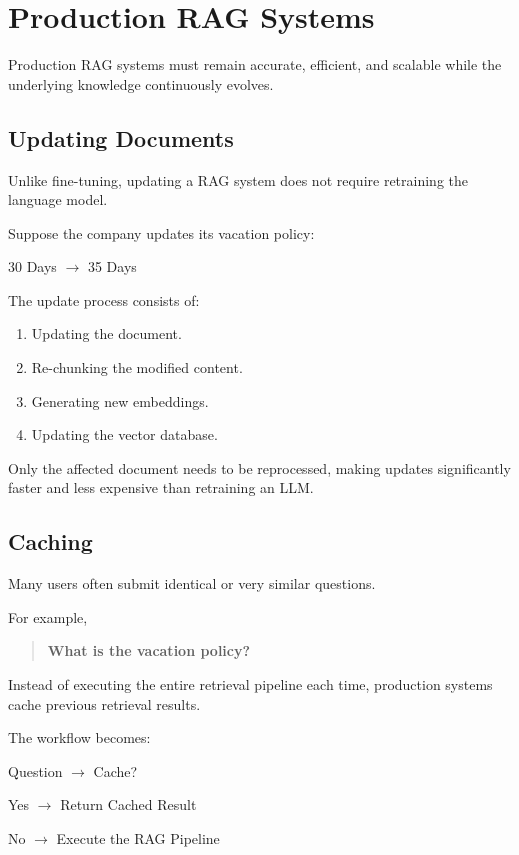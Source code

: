 \section{Production RAG Systems}

Production RAG systems must remain accurate, efficient, and scalable while the underlying knowledge continuously evolves.

\subsection*{Updating Documents}

Unlike fine-tuning, updating a RAG system does not require retraining the language model.

Suppose the company updates its vacation policy:

\begin{center}
30 Days $\rightarrow$ 35 Days
\end{center}

The update process consists of:

\begin{enumerate}
    \item Updating the document.
    \item Re-chunking the modified content.
    \item Generating new embeddings.
    \item Updating the vector database.
\end{enumerate}

Only the affected document needs to be reprocessed, making updates significantly faster and less expensive than retraining an LLM.

\subsection*{Caching}

Many users often submit identical or very similar questions.

For example,

\begin{quote}
\textbf{What is the vacation policy?}
\end{quote}

Instead of executing the entire retrieval pipeline each time, production systems cache previous retrieval results.

The workflow becomes:

\begin{center}
Question $\rightarrow$ Cache?

Yes $\rightarrow$ Return Cached Result

No $\rightarrow$ Execute the RAG Pipeline
\end{center}

